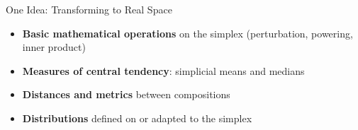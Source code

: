 \begin{frame}{One Idea: Transforming to Real Space}
{    
      \begin{itemize}
        \item[1)] \textbf{Basic mathematical operations} on the simplex (perturbation, powering, inner product)
        \item[2)] \textbf{Measures of central tendency}: simplicial means and medians

        \item[3)] \textbf{Distances and metrics} between compositions
        \item[4)] \textbf{Distributions} defined on or adapted to the simplex
      \end{itemize}
}




\end{frame}




   

    



